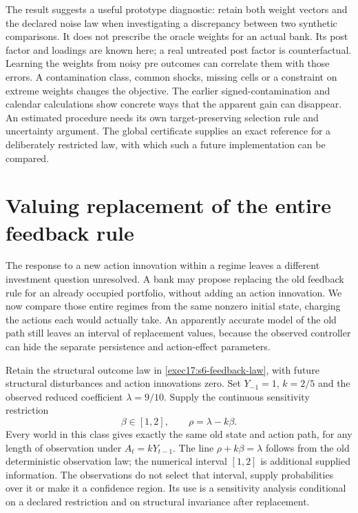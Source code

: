 The result suggests a useful prototype diagnostic: retain both weight
vectors and the declared noise law when investigating a discrepancy between
two synthetic comparisons. It does not prescribe the oracle weights for an
actual bank. Its post factor and loadings are known here; a real untreated
post factor is counterfactual. Learning the weights from noisy pre outcomes
can correlate them with those errors. A contamination class, common shocks,
missing cells or a constraint on extreme weights changes the objective.
The earlier signed-contamination and calendar calculations show concrete
ways that the apparent gain can disappear. An estimated procedure needs its
own target-preserving selection rule and uncertainty argument. The global
certificate supplies an exact reference for a deliberately restricted law,
with which such a future implementation can be compared.

\section{Valuing replacement of the entire feedback rule}
\label{exec17:s6-full-rule}

The response to a new action innovation within a regime leaves a different
investment question unresolved. A bank may propose replacing the old
feedback rule for an already occupied portfolio, without adding an action
innovation. We now compare those entire regimes from the same nonzero
initial state, charging the actions each would actually take. An apparently
accurate model of the old path still leaves an interval of replacement
values, because the observed controller can hide the separate persistence
and action-effect parameters.

Retain the structural outcome law in \eqref{exec17:s6-feedback-law}, with
future structural disturbances and action innovations zero. Set $Y_{-1}=1$,
$k=2/5$ and the observed reduced coefficient $\lambda=9/10$. Supply the
continuous sensitivity restriction
\begin{equation}
 \beta\in[1,2],\qquad \rho=\lambda-k\beta.
 \label{exec17:s6-controller-class}
\end{equation}
Every world in this class gives exactly the same old state and action path,
for any length of observation under $A_t=kY_{t-1}$. The line
$\rho+k\beta=\lambda$ follows from the old deterministic observation law;
the numerical interval $[1,2]$ is additional supplied information. The
observations do not select that interval, supply probabilities over it or
make it a confidence region. Its use is a sensitivity analysis conditional
on a declared restriction and on structural invariance after replacement.


